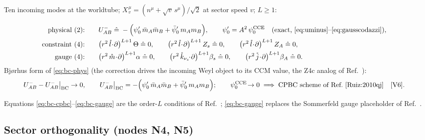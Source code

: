 Ten incoming modes at the worldtube; $X^{\mathring{}}{}^\mu_v =
(n^\mu + \sqrt{v}\,s^\mu)/\sqrt 2$ at sector speed $v$; $L\ge 1$:
\begin{nfblock}
\begin{align}
\text{physical (2):}\qquad &
U^-_{AB} \;\hat=\;
-\Big(\psi_0'\,\bar m_A\bar m_B + \bar\psi_0'\,m_A m_B\Big),
\qquad \psi_0' = A^2\,\psi_0^{\rm CCE}
\quad\text{(exact, \eqref{eq:uminus}--\eqref{eq:gausscodazzi})},
\label{eq:bc-phys}\\
\text{constraint (4):}\qquad &
\big(r^2\,\mathring l\!\cdot\!\partial\big)^{L+1}\,\Theta \;\hat=\; 0,
\qquad
\big(r^2\,\mathring l\!\cdot\!\partial\big)^{L+1}\,Z_s \;\hat=\; 0,
\qquad
\big(r^2\,\mathring l\!\cdot\!\partial\big)^{L+1}\,Z_A \;\hat=\; 0,
\label{eq:bc-cpbc}\\
\text{gauge (4):}\qquad &
\big(r^2\,\mathring m\!\cdot\!\partial\big)^{L+1}\alpha \;\hat=\; 0,
\qquad
\big(r^2\,\mathring k_{\nu_s}\!\!\cdot\!\partial\big)^{L+1}\beta_s \;\hat=\; 0,
\qquad
\big(r^2\,\mathring j\!\cdot\!\partial\big)^{L+1}\beta_A \;\hat=\; 0 .
\label{eq:bc-gauge}
\end{align}
Bj{\o}rhus form of \eqref{eq:bc-phys} (the correction drives the
incoming Weyl object to its CCM value, the Z4c analog of
Ref.~\cite{Ma:2023qjn}):
\begin{equation}
U^-_{AB} - U^-_{AB}\big|_{\rm BC} \to 0,
\qquad
U^-_{AB}\big|_{\rm BC} = -\Big(\psi_0'\,\bar m_A\bar m_B
 + \bar\psi_0'\,m_A m_B\Big);
\qquad
\psi_0^{\rm CCE}\!\to 0 \;\Longrightarrow\; \text{CPBC scheme of
Ref.~\cite{Ruiz:2010qj}}
\quad\text{[V6]}.
\label{eq:bjorhus}
\end{equation}
\end{nfblock}
Equations \eqref{eq:bc-cpbc}--\eqref{eq:bc-gauge} are the order-$L$
conditions of Ref.~\cite{Ruiz:2010qj}; \eqref{eq:bc-gauge} replaces the
Sommerfeld gauge placeholder of Ref.~\cite{Ma:2023qjn}.

\subsection{Sector orthogonality (nodes N4, N5)}
\label{sec:n45}

